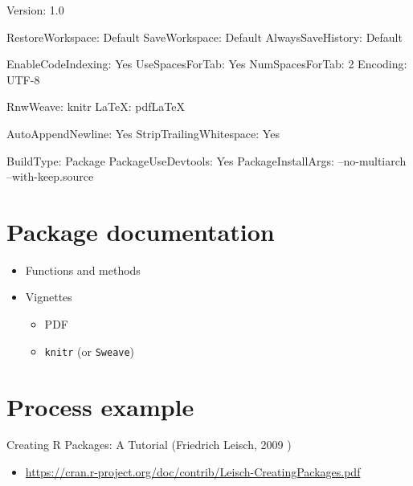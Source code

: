 \documentclass[]{book}
\newenvironment{Shaded}{\begin{snugshade}}{\end{snugshade}}
\newcommand{\DecValTok}[1]{\textcolor[rgb]{0.00,0.00,0.81}{{#1}}}
\newcommand{\FloatTok}[1]{\textcolor[rgb]{0.00,0.00,0.81}{{#1}}}
\newcommand{\StringTok}[1]{\textcolor[rgb]{0.31,0.60,0.02}{{#1}}}
\newcommand{\NormalTok}[1]{{#1}}
\providecommand{\tightlist}{%
  \setlength{\itemsep}{0pt}\setlength{\parskip}{0pt}}
\theoremstyle{definition}
\theoremstyle{definition}
\theoremstyle{definition}
\theoremstyle{remark}
\begin{document}
\begin{Shaded}
\begin{Highlighting}[]
\NormalTok{Version:}\StringTok{ }\FloatTok{1.0}

\NormalTok{RestoreWorkspace:}\StringTok{ }\NormalTok{Default}
\NormalTok{SaveWorkspace:}\StringTok{ }\NormalTok{Default}
\NormalTok{AlwaysSaveHistory:}\StringTok{ }\NormalTok{Default}

\NormalTok{EnableCodeIndexing:}\StringTok{ }\NormalTok{Yes}
\NormalTok{UseSpacesForTab:}\StringTok{ }\NormalTok{Yes}
\NormalTok{NumSpacesForTab:}\StringTok{ }\DecValTok{2}
\NormalTok{Encoding:}\StringTok{ }\NormalTok{UTF}\DecValTok{-8}

\NormalTok{RnwWeave:}\StringTok{ }\NormalTok{knitr}
\NormalTok{LaTeX:}\StringTok{ }\NormalTok{pdfLaTeX}

\NormalTok{AutoAppendNewline:}\StringTok{ }\NormalTok{Yes}
\NormalTok{StripTrailingWhitespace:}\StringTok{ }\NormalTok{Yes}

\NormalTok{BuildType:}\StringTok{ }\NormalTok{Package}
\NormalTok{PackageUseDevtools:}\StringTok{ }\NormalTok{Yes}
\NormalTok{PackageInstallArgs:}\StringTok{ }\NormalTok{--no-multiarch --with-keep.source}
\end{Highlighting}
\end{Shaded}

\section{Package documentation}\label{package-documentation}

\begin{itemize}
\item
  Functions and methods
\item
  Vignettes

  \begin{itemize}
  \tightlist
  \item
    PDF
  \item
    \texttt{knitr} (or \texttt{Sweave})
  \end{itemize}
\end{itemize}

\section{Process example}\label{process-example}

Creating R Packages: A Tutorial (Friedrich Leisch, 2009 )

\begin{itemize}
\tightlist
\item
  \url{https://cran.r-project.org/doc/contrib/Leisch-CreatingPackages.pdf}
\end{itemize}
\end{document}
